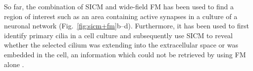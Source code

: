 So far, the combination of SICM and wide-field FM has been used to find a
region of interest such as an area containing active synapses in a culture of
a neuronal network \cite{Novak2013,Scheenen2015}
(Fig.~\ref{fig:sicm+fm}b--d). Furthermore, it has been used to first identify
primary cilia in a cell culture and subsequently use SICM to reveal whether
the selected cilium was extending into the extracellular space or was embedded
in the cell, an information which could not be retrieved by using FM alone
\cite{Zhou2018}.





